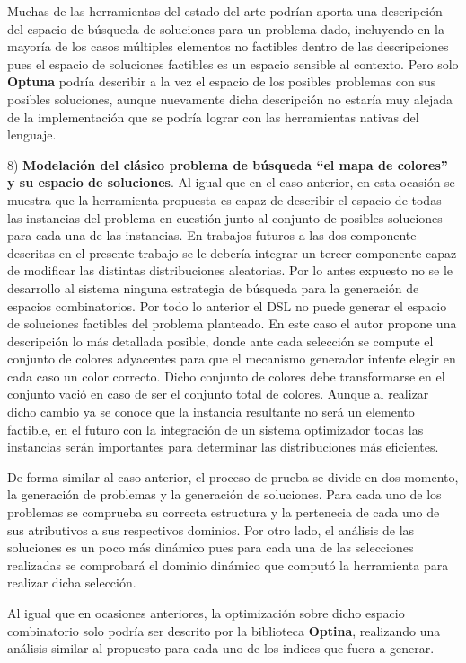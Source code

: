 Muchas de las herramientas del estado del arte podrían aporta una descripción del espacio de búsqueda de soluciones para un problema
dado, incluyendo en la mayoría de los casos múltiples elementos no factibles dentro de las descripciones pues el espacio de
soluciones factibles es un espacio sensible al contexto. Pero solo {\bf Optuna} podría describir a la vez el espacio de los posibles
problemas con sus posibles soluciones, aunque nuevamente dicha descripción no estaría muy alejada de la implementación que se podría
lograr con las herramientas nativas del lenguaje.

8) {\bf Modelación del clásico problema de búsqueda “el mapa de colores” y su espacio de soluciones}. Al igual que en el caso anterior,
en esta ocasión se muestra que la herramienta propuesta es capaz de describir el espacio de todas las instancias del problema en
cuestión junto al conjunto de posibles soluciones para cada una de las instancias. En trabajos futuros a las dos componente descritas
en el presente trabajo se le debería integrar un tercer componente capaz de modificar las distintas distribuciones aleatorias. Por
lo antes expuesto no se le desarrollo al sistema ninguna estrategia de búsqueda para la generación de espacios combinatorios. Por
todo lo anterior el DSL no puede generar el espacio de soluciones factibles del problema planteado. En este caso el autor propone
una descripción lo más detallada posible, donde ante cada selección se compute el conjunto de colores adyacentes para que el mecanismo
generador intente elegir en cada caso un color correcto. Dicho conjunto de colores debe transformarse en el conjunto vació en caso de
ser el conjunto total de colores. Aunque al realizar dicho cambio ya se conoce que la instancia resultante no será un elemento factible,
en el futuro con la integración de un sistema optimizador todas las instancias serán importantes para determinar las distribuciones
más eficientes.

De forma similar al caso anterior, el proceso de prueba se divide en dos momento, la generación de problemas y la generación de
soluciones. Para cada uno de los problemas se comprueba su correcta estructura y la pertenecia de cada uno de sus atributivos a sus
respectivos dominios. Por otro lado, el análisis de las soluciones es un poco más dinámico pues para cada una de las selecciones
realizadas se comprobará el dominio dinámico que computó la herramienta para realizar dicha selección.

Al igual que en ocasiones anteriores, la optimización sobre dicho espacio combinatorio solo podría ser descrito por la biblioteca
      {\bf Optina}, realizando una análisis similar al propuesto para cada uno de los indices que fuera a generar.

